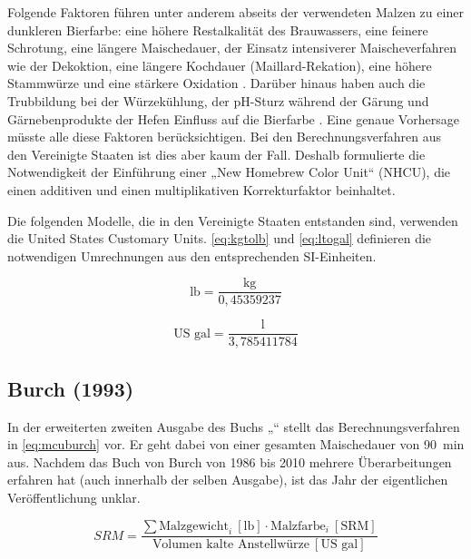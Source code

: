 \documentclass[a4paper,parskip=half]{scrartcl}
\newcommand{\SRM}{\mathit{SRM}}
\newcommand{\usrm}{\:[\textrm{SRM}]}
\newcommand{\ugal}{\:[\textrm{US gal}]}
\newcommand{\ulb}{\:[\textrm{lb}]}
\begin{document}
Folgende Faktoren führen unter anderem abseits der verwendeten Malzen zu einer dunkleren Bierfarbe: eine höhere Restalkalität des Brauwassers, eine feinere Schrotung, eine längere Maischedauer, der Einsatz intensiverer Maischeverfahren wie der Dekoktion, eine längere Kochdauer (Maillard-Rekation), eine höhere Stammwürze und eine stärkere Oxidation \parencites{KrausWeyermann2021c}[78]{Hanghofer2019}. Darüber hinaus haben auch die Trubbildung bei der Würzekühlung, der pH-Sturz während der Gärung und  Gärnebenprodukte der Hefen Einfluss auf die Bierfarbe \parencites{KrausWeyermann2021c}. Eine genaue Vorhersage müsste alle diese Faktoren berücksichtigen. Bei den Berechnungsverfahren aus den Vereinigte Staaten ist dies aber kaum der Fall. Deshalb formulierte \textcite{Colby2000} die Notwendigkeit der Einführung einer „New Homebrew Color Unit“ (NHCU), die einen additiven und einen multiplikativen Korrekturfaktor beinhaltet.

Die folgenden Modelle, die in den Vereinigte Staaten entstanden sind, verwenden die United States Customary Units. \autoref{eq:kgtolb} und \autoref{eq:ltogal} definieren die notwendigen Umrechnungen aus den entsprechenden SI-Einheiten.

\begin{equation}
\text{lb} = \frac{\text{kg}}{0,45359237}
\label{eq:kgtolb}
\end{equation}

\begin{equation}
\text{US gal} = \frac{\text{l}}{3,785411784}
\label{eq:ltogal}
\end{equation}

\subsection*{Burch (1993)}

In der erweiterten zweiten Ausgabe des Buchs „“ stellt \textcite[102]{Burch2010} das Berechnungsverfahren in \autoref{eq:mcuburch} vor. Er geht dabei von einer gesamten Maischedauer von 90~min aus. Nachdem das Buch von Burch von 1986 bis 2010 mehrere Überarbeitungen erfahren hat (auch innerhalb der selben Ausgabe), ist das Jahr der eigentlichen Veröffentlichung unklar.

\begin{equation}
\SRM = \frac{\sum \text{Malzgewicht}_i \ulb \cdot \text{Malzfarbe}_i \usrm}{\text{Volumen kalte Anstellwürze} \ugal} 
\label{eq:mcuburch}
\end{equation}
\end{document}
